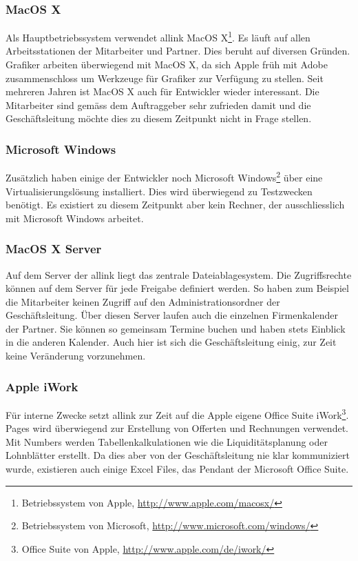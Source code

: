 \subsubsection{MacOS X}
Als Hauptbetriebssystem verwendet allink MacOS X\footnote{Betriebssystem von Apple, \url{http://www.apple.com/macosx/}}.
Es läuft auf allen Arbeitsstationen der Mitarbeiter und Partner. Dies beruht
auf diversen Gründen. Grafiker arbeiten überwiegend mit MacOS X, da sich Apple
früh mit Adobe zusammenschloss um Werkzeuge für Grafiker zur Verfügung zu stellen.
Seit mehreren Jahren ist MacOS X auch für Entwickler wieder interessant. Die 
Mitarbeiter sind gemäss dem Auftraggeber sehr zufrieden damit und die Geschäftsleitung 
möchte dies zu diesem Zeitpunkt nicht in Frage stellen.

\subsubsection{Microsoft Windows}
Zusätzlich haben einige der Entwickler noch Microsoft Windows\footnote{Betriebssystem von Microsoft, \url{http://www.microsoft.com/windows/}}
über eine Virtualisierungslösung installiert. Dies wird überwiegend zu Testzwecken 
benötigt. Es existiert zu diesem Zeitpunkt aber kein Rechner, der ausschliesslich
mit Microsoft Windows arbeitet.

\subsubsection{MacOS X Server}
Auf dem Server der allink liegt das zentrale Dateiablagesystem. Die Zugriffsrechte können
auf dem Server für jede Freigabe definiert werden. So haben zum Beispiel
die Mitarbeiter keinen Zugriff auf den Administrationsordner der Geschäftsleitung.
Über diesen Server laufen auch die einzelnen Firmenkalender der Partner. Sie
können so gemeinsam Termine buchen und haben stets Einblick in die anderen
Kalender. Auch hier ist sich die Geschäftsleitung einig, zur Zeit keine 
Veränderung vorzunehmen.

\subsubsection{Apple iWork}
Für interne Zwecke setzt allink zur Zeit auf die Apple eigene Office Suite iWork\footnote{Office Suite von Apple, \url{http://www.apple.com/de/iwork/}}.
Pages wird überwiegend zur Erstellung von Offerten und Rechnungen verwendet. Mit Numbers
werden Tabellenkalkulationen wie die Liquiditätsplanung oder Lohnblätter erstellt.
Da dies aber von der Geschäftsleitung nie klar kommuniziert wurde, existieren
auch einige Excel Files, das Pendant der Microsoft Office Suite.

